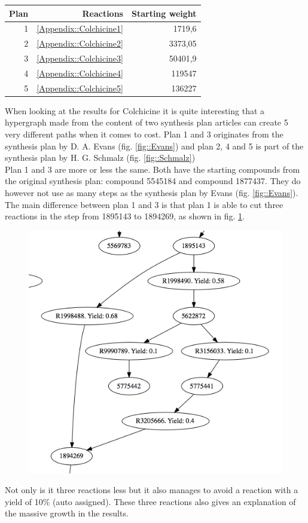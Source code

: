 \documentclass[a4paper,10pt,titlepage]{paper}
\begin{document}
\begin{table}[H]
\centering
\begin{tabular}{|r|r|r|}
\hline
Plan & Reactions & Starting weight \\ \hline
1 & \ref{Appendix::Colchicine1} & 1719,6 \\\hline
2 & \ref{Appendix::Colchicine2} & 3373,05 \\\hline
3 & \ref{Appendix::Colchicine3} & 50401,9 \\\hline
4 & \ref{Appendix::Colchicine4} & 119547 \\\hline
5 & \ref{Appendix::Colchicine5} & 136227 \\\hline
\end{tabular}
\label{tab::ColchicineResults}
\end{table}
When looking at the results for Colchicine it is quite interesting that a hypergraph made from the content of two synthesis plan articles can create 5 very different paths when it comes to cost. Plan 1 and 3 originates from the synthesis plan by D. A. Evans (fig. \ref{fig::Evans}) and plan 2, 4 and 5 is part of the synthesis plan by H. G. Schmalz (fig. \ref{fig::Schmalz})\\

Plan 1 and 3 are more or less the same. Both have the starting compounds from the original synthesis plan: compound 5545184 and compound 1877437. They do however not use as many steps as the synthesis plan by Evans (fig. \ref{fig::Evans}). The main difference between plan 1 and 3 is that plan 1 is able to cut three reactions in the step from 1895143 to 1894269, as shown in fig. \ref{fig::EvansCut}.\\
\begin{figure}[H]
\centering
\includegraphics[scale=0.5]{Billeder/EvansCut.png}
\caption{}
\label{fig::EvansCut}
\end{figure}
Not only is it three reactions less but it also manages to avoid a reaction with a yield of 10\% (auto assigned). These three reactions also gives an explanation of the massive growth in the results.\\
\end{document}
